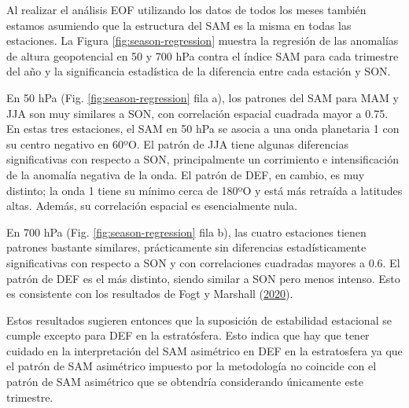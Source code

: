 \documentclass[12pt,oneside,a4paper]{reedthesis}
\begin{document}
Al realizar el análisis EOF utilizando los datos de todos los meses también estamos asumiendo que la estructura del SAM es la misma en todas las estaciones.
La Figura \ref{fig:season-regression} muestra la regresión de las anomalías de altura geopotencial en 50 y 700 hPa contra el índice SAM para cada trimestre del año y la significancia estadística de la diferencia entre cada estación y SON.

En 50 hPa (Fig. \ref{fig:season-regression} fila a), los patrones del SAM para MAM y JJA son muy similares a SON, con correlación espacial cuadrada mayor a 0.75.
En estas tres estaciones, el SAM en 50 hPa se asocia a una onda planetaria 1 con su centro negativo en 60ºO.
El patrón de JJA tiene algunas diferencias significativas con respecto a SON, principalmente un corrimiento e intensificación de la anomalía negativa de la onda.
El patrón de DEF, en cambio, es muy distinto; la onda 1 tiene su mínimo cerca de 180ºO y está más retraída a latitudes altas.
Además, su correlación espacial es esencialmente nula.

En 700 hPa (Fig. \ref{fig:season-regression} fila b), las cuatro estaciones tienen patrones bastante similares, prácticamente sin diferencias estadísticamente significativas con respecto a SON y con correlaciones cuadradas mayores a 0.6.
El patrón de DEF es el más distinto, siendo similar a SON pero menos intenso.
Esto es consistente con los resultados de Fogt y Marshall (\protect\hyperlink{ref-fogt2020}{2020}).

Estos resultados sugieren entonces que la suposición de estabilidad estacional se cumple excepto para DEF en la estratósfera.
Esto indica que hay que tener cuidado en la interpretación del SAM asimétrico en DEF en la estratosfera ya que el patrón de SAM asimétrico impuesto por la metodología no coincide con el patrón de SAM asimétrico que se obtendría considerando únicamente este trimestre.
\end{document}
